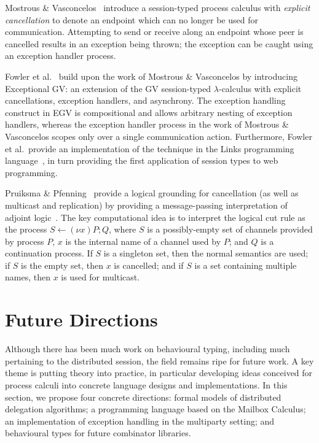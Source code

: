 \documentclass[
graybox,
envcountchap
]{svmult}
\begin{document}
\begin{bibunit}
  Mostrous \& Vasconcelos~\cite{MostrousV18:affine} introduce a session-typed
  process calculus with \emph{explicit cancellation} to denote an endpoint which
  can no longer be used for communication. Attempting to send or receive along
  an endpoint whose peer is cancelled results in an exception being thrown; the
  exception can be caught using an exception handler process.

  Fowler et al.~\cite{FowlerLMD19:stwt} build upon the work of Mostrous \&
  Vasconcelos by introducing Exceptional GV: an extension of the GV
  session-typed $\lambda$-calculus with explicit cancellations, exception
  handlers, and asynchrony. The exception handling construct in EGV is
  compositional and allows arbitrary nesting of exception handlers, whereas the
  exception handler process in the work of Mostrous \& Vasconcelos scopes only
  over a single communication action. Furthermore, Fowler et al.\ provide an
  implementation of the technique in the Links programming
  language~\cite{CooperLWY06:links}, in turn providing the first application of
  session types to web programming.

  Pruiksma \& Pfenning~\cite{PruiksmaP19:mp-adjoint} provide a logical grounding
  for cancellation (as well as multicast and replication) by providing a
  message-passing interpretation of adjoint logic~\cite{PruiksmaCPR18:adjoint}.
  The key computational idea is to interpret the logical cut rule as the process
  $S \leftarrow (\nu x) P; Q$, where $S$ is a possibly-empty set of channels
  provided by process $P$, $x$ is the internal name of a channel used by $P$;
  and $Q$ is a continuation process. If $S$ is a singleton set, then the normal
  semantics are used; if $S$ is the empty set, then $x$ is cancelled; and if $S$
  is a set containing multiple names, then $x$ is used for multicast.

  \section{Future Directions}\label{sec:bt:future}
  Although there has been much work on behavioural typing, including much
  pertaining to the distributed session, the field remains ripe for future work.
  A key theme is putting theory into practice, in particular developing ideas
  conceived for process calculi into concrete language designs and
  implementations. In this section, we propose four concrete directions: formal
  models of distributed delegation algorithms; a programming language based on
  the Mailbox Calculus; an implementation of exception handling in the
  multiparty setting; and behavioural types for future combinator libraries.


\end{bibunit}
\end{document}
